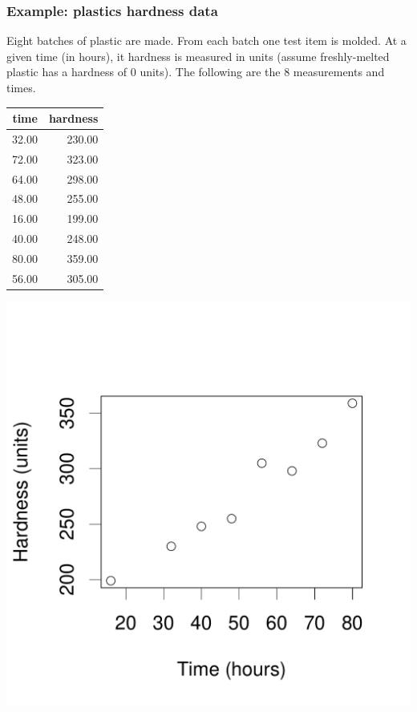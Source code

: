 \documentclass[handout]{beamer}\usepackage[]{graphicx}\usepackage[]{color}
\makeatletter
\def\maxwidth{ %
  \ifdim\Gin@nat@width>\linewidth
    \linewidth
  \else
    \Gin@nat@width
  \fi
}
\newenvironment{knitrout}{}{} %
\numberwithin{equation}{section}
\makeatother
\begin{document}
\begin{frame}[fragile]
\frametitle{Example: plastics hardness data} \small
Eight batches of plastic are made. From each batch one test item is molded. At a given time (in hours), it hardness is measured in units (assume freshly-melted plastic has a hardness of 0 units). The following are the 8 measurements and times.

\begin{minipage}[b]{0.47\linewidth} 
\begin{table}[ht]
\centering
\begin{tabular}{rr}
 time & hardness \\ 
  \hline
32.00 & 230.00 \\ 
  72.00 & 323.00 \\ 
  64.00 & 298.00 \\ 
  48.00 & 255.00 \\ 
  16.00 & 199.00 \\ 
  40.00 & 248.00 \\ 
  80.00 & 359.00 \\ 
  56.00 & 305.00 \\ 
  \end{tabular}
\end{table}

\end{minipage}
\begin{minipage}[b]{0.47\linewidth} 
\begin{knitrout}
\color{fgcolor}
\includegraphics[width=\maxwidth]{figure/unnamed-chunk-6-1} 

\end{knitrout}
\end{minipage}


\end{frame}
\end{document}
